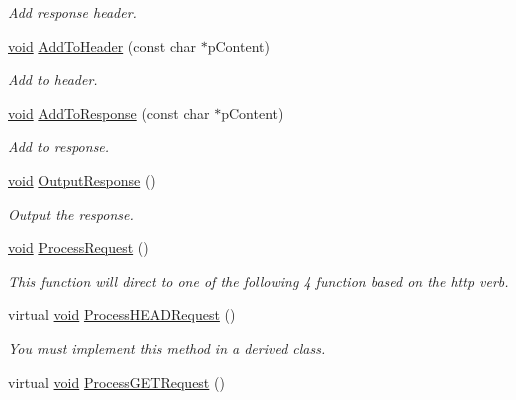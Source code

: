 \begin{DoxyCompactItemize}
\begin{DoxyCompactList}\small\item\em \-Add response header. \end{DoxyCompactList}\item 
\hyperlink{_cpclient_8h_a6464f7480a0fd0ee170cba12b2c0497f}{void} \hyperlink{class_c_g_i_c_plus_plus_ac8ca7c0557a670b8232ff3d8a6ed6280}{\-Add\-To\-Header} (const char $\ast$p\-Content)
\begin{DoxyCompactList}\small\item\em \-Add to header. \end{DoxyCompactList}\item 
\hyperlink{_cpclient_8h_a6464f7480a0fd0ee170cba12b2c0497f}{void} \hyperlink{class_c_g_i_c_plus_plus_afe65eb134d2a50350cd84aa5dbf93a77}{\-Add\-To\-Response} (const char $\ast$p\-Content)
\begin{DoxyCompactList}\small\item\em \-Add to response. \end{DoxyCompactList}\item 
\hyperlink{_cpclient_8h_a6464f7480a0fd0ee170cba12b2c0497f}{void} \hyperlink{class_c_g_i_c_plus_plus_aa4d752cb80937e653cdea73ee7761d6d}{\-Output\-Response} ()
\begin{DoxyCompactList}\small\item\em \-Output the response. \end{DoxyCompactList}\item 
\hyperlink{_cpclient_8h_a6464f7480a0fd0ee170cba12b2c0497f}{void} \hyperlink{class_c_g_i_c_plus_plus_a526b66e47624baadbf21e43004907256}{\-Process\-Request} ()
\begin{DoxyCompactList}\small\item\em \-This function will direct to one of the following 4 function based on the http verb. \end{DoxyCompactList}\item 
virtual \hyperlink{_cpclient_8h_a6464f7480a0fd0ee170cba12b2c0497f}{void} \hyperlink{class_c_g_i_c_plus_plus_a9769c9cb4d5d9245257816ff39891764}{\-Process\-H\-E\-A\-D\-Request} ()
\begin{DoxyCompactList}\small\item\em \-You must implement this method in a derived class. \end{DoxyCompactList}\item 
virtual \hyperlink{_cpclient_8h_a6464f7480a0fd0ee170cba12b2c0497f}{void} \hyperlink{class_c_g_i_c_plus_plus_a378fb441bed59d816017d7e1ea6296f2}{\-Process\-G\-E\-T\-Request} ()

\end{DoxyCompactItemize}
